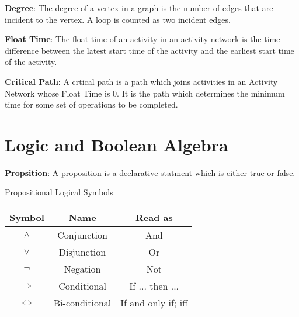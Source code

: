 \begin{defn}\label{mod1:defn:Degree}
   \textbf{Degree}: The degree of a vertex  in a graph is the number of edges that are incident to the vertex. A loop is counted as two incident edges.
\end{defn}

\begin{defn}\label{mod1:defn:FloatTime}
	\textbf{Float Time}: The float time of an activity in an activity network is the time difference between the latest start time of the activity and the earliest start time of the activity.
\end{defn}

\begin{defn}\label{mod1:defn:CritPath}
	\textbf{Critical Path}: A crtical path is a path which joins activities in an Activity Network whose Float Time is $0$. It is the path which determines the minimum time for some set of operations to be completed. 
\end{defn}
	

\section{Logic and Boolean Algebra}

\begin{defn}\label{mod1:defn:Proposition}
   \textbf{Propsition}: A proposition is a declarative statment which is either true or false.
\end{defn}

\begin{defn}\label{mod1:defn:LogicSymbols}
   Propositional Logical Symbols
      
   \begin{table}[ht]
      \centering
      \begin{tabular}{|c|c|c|}
         \hline
            Symbol & Name & Read as\\
         \hline
         $\land$ & Conjunction & And \\
         $\lor$ &   Disjunction & Or \\
         $\lnot$ & Negation & Not\\
         $\Rightarrow$ & Conditional & If ... then ...\\
         $\Leftrightarrow$ & Bi-conditional & If and only if; iff\\
         \hline
      \end{tabular}
      \label{mod1:tab:LogicSymbols}
   \end{table}

\end{defn}      

